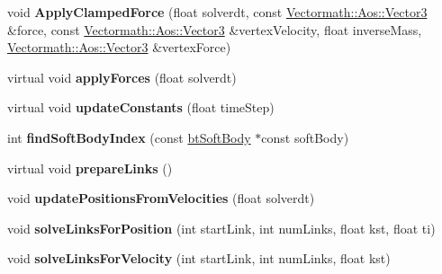 \begin{DoxyCompactItemize}
\item 
\hypertarget{classbt_d_x11_soft_body_solver_a48b489fba2b4a4efb4472f5add51bc0e}{void {\bfseries Apply\+Clamped\+Force} (float solverdt, const \hyperlink{class_vectormath_1_1_aos_1_1_vector3}{Vectormath\+::\+Aos\+::\+Vector3} \&force, const \hyperlink{class_vectormath_1_1_aos_1_1_vector3}{Vectormath\+::\+Aos\+::\+Vector3} \&vertex\+Velocity, float inverse\+Mass, \hyperlink{class_vectormath_1_1_aos_1_1_vector3}{Vectormath\+::\+Aos\+::\+Vector3} \&vertex\+Force)}\label{classbt_d_x11_soft_body_solver_a48b489fba2b4a4efb4472f5add51bc0e}

\item 
\hypertarget{classbt_d_x11_soft_body_solver_add8ce1d22fa454695703e7ab2d2dfece}{virtual void {\bfseries apply\+Forces} (float solverdt)}\label{classbt_d_x11_soft_body_solver_add8ce1d22fa454695703e7ab2d2dfece}

\item 
\hypertarget{classbt_d_x11_soft_body_solver_a2399437c364aa862cb860ec84dcfd3f9}{virtual void {\bfseries update\+Constants} (float time\+Step)}\label{classbt_d_x11_soft_body_solver_a2399437c364aa862cb860ec84dcfd3f9}

\item 
\hypertarget{classbt_d_x11_soft_body_solver_ad84c2d73165e5e3e4f50e06791f5859c}{int {\bfseries find\+Soft\+Body\+Index} (const \hyperlink{classbt_soft_body}{bt\+Soft\+Body} $\ast$const soft\+Body)}\label{classbt_d_x11_soft_body_solver_ad84c2d73165e5e3e4f50e06791f5859c}

\item 
\hypertarget{classbt_d_x11_soft_body_solver_a263828836bda16681d534089824079c1}{virtual void {\bfseries prepare\+Links} ()}\label{classbt_d_x11_soft_body_solver_a263828836bda16681d534089824079c1}

\item 
\hypertarget{classbt_d_x11_soft_body_solver_ac76f41d29e21606203a3c571427fa6fc}{void {\bfseries update\+Positions\+From\+Velocities} (float solverdt)}\label{classbt_d_x11_soft_body_solver_ac76f41d29e21606203a3c571427fa6fc}

\item 
\hypertarget{classbt_d_x11_soft_body_solver_aacbf031c178776f7fcab836b02b269d9}{void {\bfseries solve\+Links\+For\+Position} (int start\+Link, int num\+Links, float kst, float ti)}\label{classbt_d_x11_soft_body_solver_aacbf031c178776f7fcab836b02b269d9}

\item 
\hypertarget{classbt_d_x11_soft_body_solver_a369e42f30a6c6a1b7cab882e55fb6dd7}{void {\bfseries solve\+Links\+For\+Velocity} (int start\+Link, int num\+Links, float kst)}\label{classbt_d_x11_soft_body_solver_a369e42f30a6c6a1b7cab882e55fb6dd7}


\end{DoxyCompactItemize}
